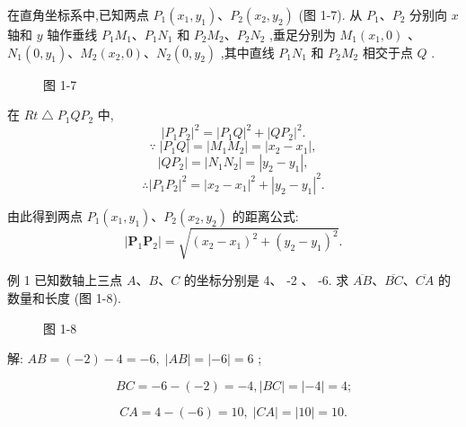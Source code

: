\documentclass[lang=cn,newtx,10.5pt,scheme=chinese]{elegantbook}
\begin{document}
在直角坐标系中,已知两点 \({P}_{1}\left( {{x}_{1},{y}_{1}}\right) \text{、}{P}_{2}\left( {{x}_{2},{y}_{2}}\right)\) (图 1-7). 从 \({P}_{1}\text{、}{P}_{2}\) 分别向 \(x\) 轴和 \(y\) 轴作垂线 \({P}_{1}{M}_{1}\text{、}{P}_{1}{N}_{1}\) 和 \({P}_{2}{M}_{2}\text{、}{P}_{2}{N}_{2}\) ,垂足分别为 \({M}_{1}\left( {{x}_{1},0}\right)\) 、 \({N}_{1}\left( {0,{y}_{1}}\right) \text{、}{M}_{2}\left( {{x}_{2},0}\right) \text{、}{N}_{2}\left( {0,{y}_{2}}\right)\) ,其中直线 \({P}_{1}{N}_{1}\) 和 \({P}_{2}{M}_{2}\) 相交于点 \(Q\) .

\begin{figure}[h]
  \centering
  
  \caption{图 1-7}
\end{figure}

在 \({Rt}\bigtriangleup {P}_{1}Q{P}_{2}\) 中,
\[
{\left| {P}_{1}{P}_{2}\right| }^{2} = {\left| {P}_{1}Q\right| }^{2} + {\left| Q{P}_{2}\right| }^{2} .
\]
\[
\because \;\left| {{P}_{1}Q}\right| = \left| {{M}_{1}{M}_{2}}\right| = \left| {{x}_{2} - {x}_{1}}\right| , 
\]
\[
\left| {Q{P}_{2}}\right| = \left| {{N}_{1}{N}_{2}}\right| = \left| {{y}_{2} - {y}_{1}}\right| ,
\]
\[
  \therefore {\left| {P}_{1}{P}_{2}\right| }^{2} = {\left| {x}_{2} - {x}_{1}\right| }^{2} + {\left| {y}_{2} - {y}_{1}\right| }^{2}\text{.}
\]
\begin{corollary}[两点间距离公式]
由此得到两点 \({P}_{1}\left( {{x}_{1},{y}_{1}}\right) \text{、}{P}_{2}\left( {{x}_{2},{y}_{2}}\right)\) 的距离公式:
\[
  \left| {{\mathbf{P}}_{1}{\mathbf{P}}_{2}}\right| = \sqrt{{\left( {x}_{2} - {x}_{1}\right) }^{2} + {\left( {y}_{2} - {y}_{1}\right) }^{2}}.
\]
\end{corollary}
例 1 已知数轴上三点 \(A\text{、}B\text{、}C\) 的坐标分别是 4、 -2 、 -6. 求 \(\overline{AB}\text{、}\overline{BC}\text{、}\overline{CA}\) 的数量和长度 (图 1-8).

\begin{figure}[h]
  \centering
  
  \caption{图 1-8}
\end{figure}

解: \({AB} = \left( {-2}\right) - 4 = - 6,\;\left| {AB}\right| = \left| {-6}\right| = 6\) ;

\[
    {BC} = - 6 - \left( {-2}\right) = - 4,\left| {BC}\right| = \left| {-4}\right| = 4\text{;}
\]

\[
    {CA} = 4 - \left( {-6}\right) = {10},\;\left| {CA}\right| = \left| {10}\right| = {10}.
\]
\end{document}
